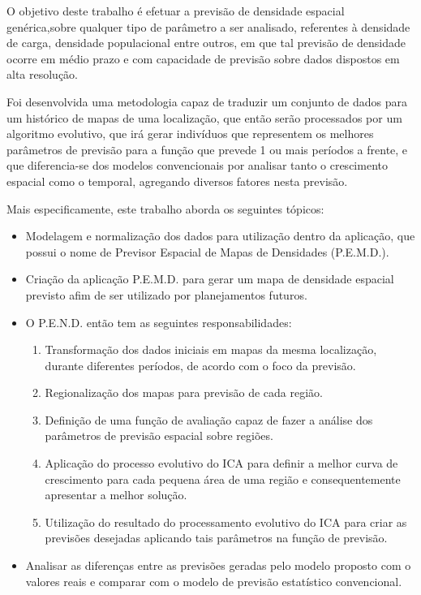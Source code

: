 O objetivo deste trabalho é efetuar a previsão de densidade espacial genérica,sobre qualquer tipo de parâmetro a ser analisado, referentes à densidade de carga, densidade populacional entre outros, em que tal previsão de densidade ocorre em médio prazo e com capacidade de previsão sobre dados dispostos em alta resolução.

Foi desenvolvida uma metodologia capaz de traduzir um conjunto de dados para um histórico de mapas de uma localização, que então serão processados por um algoritmo evolutivo, que irá gerar indivíduos que representem os melhores parâmetros de previsão para a função que prevede 1 ou mais períodos a frente, e que diferencia-se dos modelos convencionais por analisar tanto o crescimento espacial como o temporal, agregando diversos fatores nesta previsão. 

Mais especificamente, este trabalho aborda os seguintes tópicos:

\begin{itemize}
	\item Modelagem e normalização dos dados para utilização dentro da aplicação, que possui o nome de Previsor Espacial de Mapas de Densidades (P.E.M.D.).
	\item Criação da aplicação P.E.M.D. para gerar um mapa de densidade espacial previsto afim de ser utilizado por planejamentos futuros.
	\item O P.E.N.D. então tem as seguintes responsabilidades: 
	\begin{enumerate}
		\item Transformação dos dados iniciais em mapas da mesma localização, durante diferentes períodos, de acordo com o foco da previsão.
		\item Regionalização dos mapas para previsão de cada região.
		\item Definição de uma função de avaliação capaz de fazer a análise dos parâmetros de previsão espacial sobre regiões.
		\item Aplicação do processo evolutivo do ICA para definir a melhor curva de crescimento para cada pequena área de uma região e consequentemente apresentar a melhor solução.
		\item Utilização do resultado do processamento evolutivo do ICA para criar as previsões desejadas aplicando tais parâmetros na função de previsão.
	\end{enumerate}
	\item Analisar as diferenças entre as previsões geradas pelo modelo proposto com o valores reais e comparar com o modelo de previsão estatístico convencional. 
\end{itemize}



